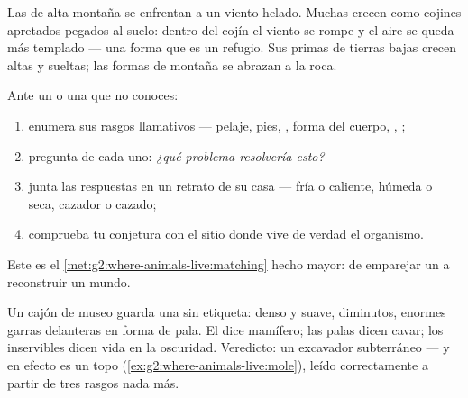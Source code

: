 \begin{example}\label{ex:g4:adapted-to-their-world:alpine}
Las  de alta montaña se enfrentan a un viento helado. Muchas
crecen como cojines apretados pegados al suelo: dentro del cojín el
viento se rompe y el aire se queda más templado --- una forma que es
un refugio. Sus primas de tierras bajas crecen altas y sueltas; las
formas de montaña se abrazan a la roca.
\end{example}

\begin{method}\label{met:g4:adapted-to-their-world:read}
Ante un  o una  que no conoces:
\begin{enumerate}
  \item enumera sus rasgos llamativos --- pelaje, pies, , forma del
        cuerpo, , ;
  \item pregunta de cada uno: \emph{¿qué problema resolvería esto?}
  \item junta las respuestas en un retrato de su casa --- fría o
        caliente, húmeda o seca, cazador o cazado;
  \item comprueba tu conjetura con el sitio donde vive de verdad el
        organismo.
\end{enumerate}
Este es el \cref{met:g2:where-animals-live:matching} hecho mayor: de
emparejar un  a reconstruir un mundo.
\end{method}

\begin{example}\label{ex:g4:adapted-to-their-world:mystery}
Un cajón de museo guarda una  sin etiqueta:  denso y suave,
 diminutos, enormes garras delanteras en forma de pala. El 
dice mamífero; las palas dicen cavar; los  inservibles dicen vida
en la oscuridad. Veredicto: un excavador subterráneo --- y en efecto
es un topo (\cref{ex:g2:where-animals-live:mole}), leído correctamente
a partir de tres rasgos nada más.
\end{example}


